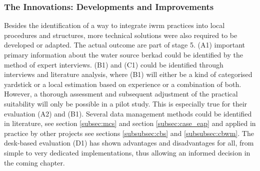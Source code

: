 



\subsubsection{The Innovations: Developments and Improvements}\label{subsubsec:innovations_appl}

Besides the identification of a way to integrate \acrshort{iwrm} practices into local procedures and structures, more technical solutions were also required to be developed or adapted. The actual outcome are part of stage 5. (A1) important primary information about the water source berkad could be identified by the method of expert interviews. (B1) and (C1) could be identified through interviews and literature analysis, where (B1) will either be a kind of categorised yardstick or a local estimation based on experience or a combination of both. However, a thorough assessment and subsequent adjustment of the practical suitability will only be possible in a pilot study. This is especially true for their evaluation (A2) and (B1). Several data management methods could be identified in literature, see section \ref*{subsec:mcs} and section \ref{subsec:case_eap} and applied in practice by other projects see sections \ref*{subsubsec:cbs} and \ref*{subsubsec:cbwm}. The desk-based evaluation (D1) has shown advantages and disadvantages for all, from simple to very dedicated implementations, thus allowing an informed decision in the coming chapter.


